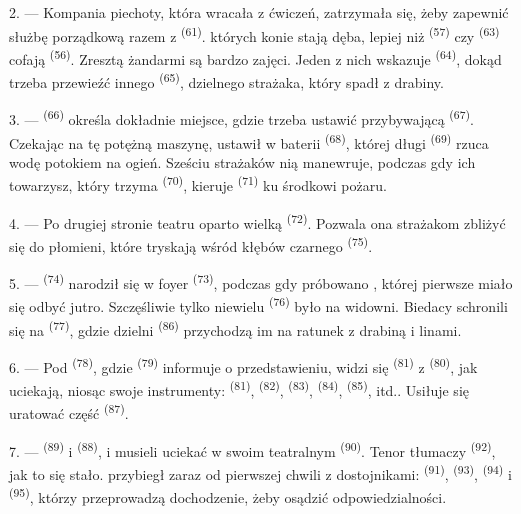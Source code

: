 2. --- Kompania piechoty, która wracała z ćwiczeń, zatrzymała się, żeby zapewnić służbę
porządkową razem z  \textsuperscript{(61)}.
 których konie stają dęba, lepiej niż 
\textsuperscript{(57)} czy  \textsuperscript{(63)} cofają
 \textsuperscript{(56)}. Zresztą żandarmi są bardzo zajęci. Jeden z
nich wskazuje  \textsuperscript{(64)}, dokąd trzeba przewieźć innego
 \textsuperscript{(65)}, dzielnego strażaka, który spadł z drabiny.

3. ---  \textsuperscript{(66)} określa dokładnie miejsce, gdzie trzeba
ustawić przybywającą  \textsuperscript{(67)}. Czekając na tę
potężną maszynę, ustawił w baterii  \textsuperscript{(68)},
której długi  \textsuperscript{(69)} rzuca wodę potokiem na ogień. Sześciu
strażaków nią manewruje, podczas gdy ich towarzysz, który trzyma 
\textsuperscript{(70)}, kieruje  \textsuperscript{(71)} ku środkowi
pożaru.

4. --- Po drugiej stronie teatru oparto wielką  \textsuperscript{(72)}.
Pozwala ona strażakom zbliżyć się do płomieni, które tryskają wśród kłębów czarnego
 \textsuperscript{(75)}.

\VUsaut{5.0mm}
\VUsaut{3.4mm}

5. ---  \textsuperscript{(74)} narodził się w foyer 
\textsuperscript{(73)}, podczas gdy próbowano , której pierwsze
 miało się odbyć jutro. Szczęśliwie tylko niewielu
 \textsuperscript{(76)} było na widowni. Biedacy schronili się na
 \textsuperscript{(77)}, gdzie dzielni 
\textsuperscript{(86)} przychodzą im na ratunek z drabiną i linami.

6. --- Pod  \textsuperscript{(78)}, gdzie 
\textsuperscript{(79)} informuje o przedstawieniu, widzi się 
\textsuperscript{(81)} z  \textsuperscript{(80)}, jak uciekają, niosąc
swoje instrumenty:  \textsuperscript{(81)}, 
\textsuperscript{(82)},  \textsuperscript{(83)}, 
\textsuperscript{(84)},  \textsuperscript{(85)}, itd.. Usiłuje się
uratować część  \textsuperscript{(87)}.

7. ---  \textsuperscript{(89)} i 
\textsuperscript{(88)},  i  musieli uciekać w swoim
teatralnym  \textsuperscript{(90)}. Tenor tłumaczy
 \textsuperscript{(92)}, jak to się stało.
 przybiegł zaraz od pierwszej chwili z dostojnikami:
 \textsuperscript{(91)},  \textsuperscript{(93)},
 \textsuperscript{(94)} i 
\textsuperscript{(95)}, którzy przeprowadzą dochodzenie, żeby osądzić
odpowiedzialności.
\VUsaut{6.0mm}
\VUfilet{22mm}
